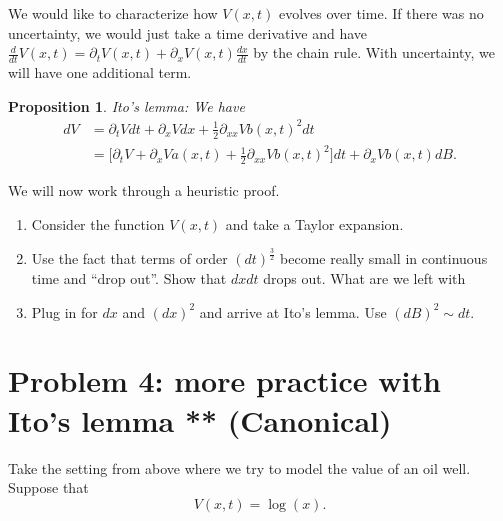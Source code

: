 \documentclass[11pt]{extarticle}
\theoremstyle{plain}
\newtheorem{prop}[thm]{Proposition}
\theoremstyle{definition}
\begin{document}
We would like to characterize how $V(x, t)$ evolves over time. If there was no uncertainty, we would just take a time derivative and have $\frac{d}{dt} V(x, t) = \partial_t V(x, t) + \partial_x V(x, t) \frac{dx}{dt}$ by the chain rule. With uncertainty, we will have one additional term. 

\begin{prop}
	Ito's lemma: We have 
	\begin{align*}
		dV &= \partial_t V dt + \partial_x V dx + \frac{1}{2} \partial_{xx} V b(x, t)^2 dt \\
		&= \bigg[ \partial_t V + \partial_x V a(x, t) + \frac{1}{2} \partial_{xx} V b(x, t)^2\bigg] dt + \partial_x V b(x, t) dB.
	\end{align*}
\end{prop}

\vspace{5mm}
\noindent
We will now work through a heuristic proof.
\begin{enumerate}
\item Consider the function $V(x, t)$ and take a Taylor expansion.

\item Use the fact that terms of order $(dt)^\frac{3}{2}$ become really small in continuous time and ``drop out''. Show that $dx dt$ drops out. What are we left with

\item Plug in for $dx$ and $(dx)^2$ and arrive at Ito's lemma. Use $(dB)^2 \sim dt$.

\end{enumerate}




\vspace{10mm}
\section*{Problem 4: more practice with Ito's lemma ** (Canonical)}

Take the setting from above where we try to model the value of an oil well. Suppose that 
\begin{equation*}
	V(x, t) = \log(x).
\end{equation*}
\end{document}
